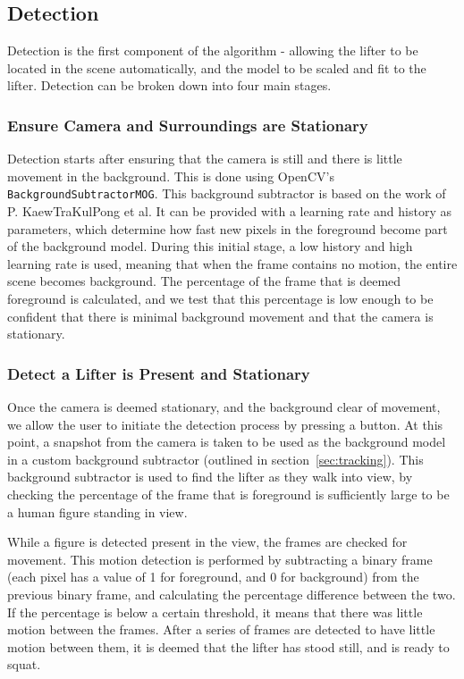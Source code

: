 \subsection{Detection}

Detection is the first component of the algorithm - allowing the lifter to be located in the scene automatically, and the model to be scaled and fit to the lifter. Detection can be broken down into four main stages.

\subsubsection{Ensure Camera and Surroundings are Stationary}
Detection starts after ensuring that the camera is still and there is little movement in the background. This is done using OpenCV's \verb!BackgroundSubtractorMOG!. This background subtractor is based on the work of P. KaewTraKulPong et al\cite{backgroundsubmog}. It can be provided with a learning rate and history as parameters, which determine how fast new pixels in the foreground become part of the background model. During this initial stage, a low history and high learning rate is used, meaning that when the frame contains no motion, the entire scene becomes background. The percentage of the frame that is deemed foreground is calculated, and we test that this percentage is low enough to be confident that there is minimal background movement and that the camera is stationary.

\subsubsection{Detect a Lifter is Present and Stationary}
Once the camera is deemed stationary, and the background clear of movement, we allow the user to initiate the detection process by pressing a button. At this point, a snapshot from the camera is taken to be used as the background model in a custom background subtractor (outlined in section~\ref{sec:tracking}). This background subtractor is used to find the lifter as they walk into view, by checking the percentage of the frame that is foreground is sufficiently large to be a human figure standing in view. 

While a figure is detected present in the view, the frames are checked for movement. This motion detection is performed by subtracting a binary frame (each pixel has a value of 1 for foreground, and 0 for background) from the previous binary frame, and calculating the percentage difference between the two. If the percentage is below a certain threshold, it means that there was little motion between the frames. After a series of frames are detected to have little motion between them, it is deemed that the lifter has stood still, and is ready to squat.

